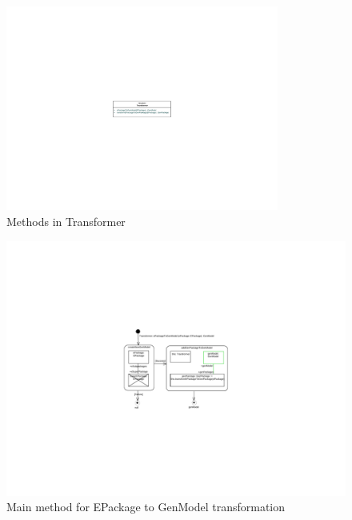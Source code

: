 \begin{figure}[htbp]
\begin{center}  
\includegraphics[width=0.8\textwidth]{pics/Ecore2GenModel/CDTransformer}
\caption{Methods in \textsf{Transformer}}  
\label{fig_e2gm}
\end{center}
\end{figure} 

\begin{figure}[htbp]
\begin{center}  \includegraphics[width=1.0\textwidth]{pics/Ecore2GenModel/SDMePackageToGenModel.pdf}
        \caption{Main method for \textsf{EPackage} to \textsf{GenModel} transformation}  
  \label{fig_pack2gm}
\end{center}
\end{figure} 

